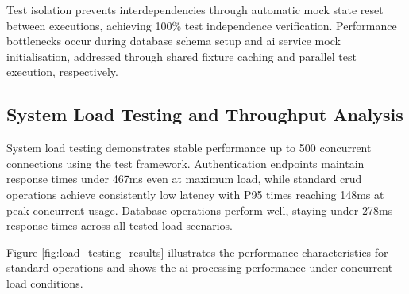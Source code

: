 Test isolation prevents interdependencies through automatic mock state reset between executions, achieving 100\% test independence verification. Performance bottlenecks occur during database schema setup and \ac{ai} service mock initialisation, addressed through shared fixture caching and parallel test execution, respectively.

\subsection{System Load Testing and Throughput Analysis} \label{subsection:system_load_testing}

System load testing demonstrates stable performance up to 500 concurrent connections using the test framework. Authentication endpoints maintain response times under 467ms even at maximum load, while standard \ac{crud} operations achieve consistently low latency with P95 times reaching 148ms at peak concurrent usage. Database operations perform well, staying under 278ms response times across all tested load scenarios.

Figure \ref{fig:load_testing_results} illustrates the performance characteristics for standard operations and shows the \ac{ai} processing performance under concurrent load conditions.

